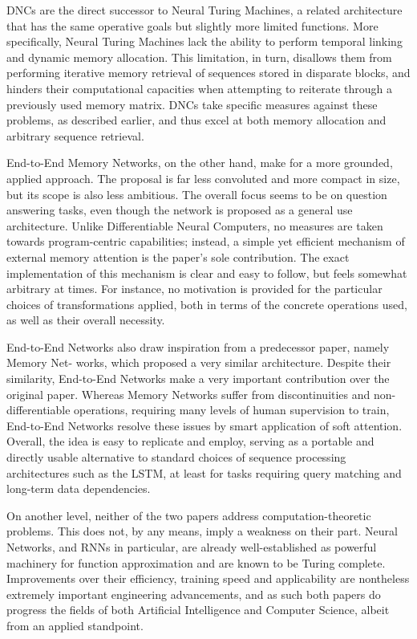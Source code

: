 \documentclass[]{article}
\begin{document}
DNCs are the direct successor to Neural Turing Machines\cite{DBLP:journals/corr/GravesWD14}, a related architecture that has the same operative goals but slightly more limited functions. More specifically, Neural Turing Machines lack the ability to perform temporal linking and dynamic memory allocation. This limitation, in turn, disallows them from performing iterative memory retrieval of sequences stored in disparate blocks, and hinders their computational capacities when attempting to reiterate through a previously used memory matrix. DNCs take specific measures against these problems, as described earlier, and thus excel at both memory allocation and arbitrary sequence retrieval.

End-to-End Memory Networks, on the other hand, make for a more grounded, applied approach. The proposal is far less convoluted and more compact in size, but its scope is also less ambitious. The overall focus seems to be on question answering tasks, even though the network is proposed as a general use architecture. Unlike Differentiable Neural Computers, no measures are taken towards program-centric capabilities; instead, a simple yet efficient mechanism of external memory attention is the paper's sole contribution. The exact implementation of this mechanism is clear and easy to follow, but feels somewhat arbitrary at times. For instance, no motivation is provided for the particular choices of transformations applied, both in terms of the concrete operations used, as well as their overall necessity. 

End-to-End Networks also draw inspiration from a predecessor paper, namely Memory Net-
works\cite{DBLP:journals/corr/WestonCB14}, which proposed a very similar architecture. Despite their similarity, End-to-End Networks make a very important contribution over the original paper. Whereas Memory Networks suffer from discontinuities and non-differentiable operations, requiring many levels of human supervision to train, End-to-End Networks resolve these issues by smart application of soft attention. Overall, the idea is easy to replicate and employ, serving as a portable and directly usable alternative to standard choices of sequence processing architectures such as the LSTM, at least for tasks requiring query matching and long-term data dependencies.

On another level, neither of the two papers address computation-theoretic problems. This does not, by any means, imply a weakness on their part. Neural Networks, and RNNs in particular, are already well-established as powerful machinery for function approximation\cite{Cybenko1989} and are known to be Turing complete\cite{SIEGELMANN1995132}. Improvements over their efficiency, training speed and applicability are nontheless extremely important engineering advancements, and as such both papers do progress the fields of both Artificial Intelligence and Computer Science, albeit from an applied standpoint.
\end{document}
